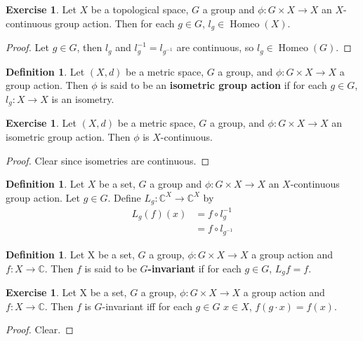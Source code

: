 \documentclass[12pt]{amsart}
\theoremstyle{definition}
\newtheorem{defn}[definition]{Definition}
\newtheorem{ex}[definition]{Exercise}
\newcommand{\C}{\mathbb{C}}
\newcommand{\tbf}[1]{\textbf{#1}}
\DeclareMathOperator{\Homeo}{Homeo}
\DeclareMathOperator*{\0}{\mbf{0}}
\DeclareMathOperator*{\1}{\mbf{1}}
\newcommand{\ld}[1]{\label{defn:#1}}
\begin{document}
	\begin{ex}
	Let $X$ be a topological space, $G$ a group and $\phi: G \times X \rightarrow X$ an $X$-continuous group action. Then for each $g \in G$, $l_g \in \Homeo(X)$.
	\end{ex}
	
	\begin{proof}
	Let $g \in G$, then $l_g$ and $l_{g}^{-1} = l_{g^{-1}}$ are continuous, so $l_g \in \Homeo(G)$. 
	\end{proof}
	
	\begin{defn} \ld{}
	Let $(X, d)$ be a metric space, $G$ a group, and $\phi: G \times X \rightarrow X$ a group action. Then $\phi$ is said to be an \tbf{isometric group action} if for each $g \in G$, $l_g:X \rightarrow X$ is an isometry. 
	\end{defn}
	
	\begin{ex}
	Let $(X, d)$ be a metric space, $G$ a group, and $\phi: G \times X \rightarrow X$ an isometric group action. Then $\phi$ is $X$-continuous.
	\end{ex}
	
	\begin{proof}
	Clear since isometries are continuous.
\end{proof}		
	
	\begin{defn}
	Let $X$ be a set, $G$ a group and $\phi: G \times X \rightarrow X$ an $X$-continuous group action. Let $g \in G$. Define $L_g:\C^X \rightarrow \C^X$ by 
	\begin{align*}
	L_g(f)(x) 
	&= f \circ l_g^{-1} \\
	&= f \circ l_{g^{-1}}
	\end{align*}
	\end{defn}
	
	
	\begin{defn}
	Let X be a set, $G$ a group, $\phi: G \times X \rightarrow X$ a group action and $f:X \rightarrow \C$. Then $f$ is said to be \tbf{$G$-invariant} if for each $g \in G$, $L_g f = f$.
	\end{defn}
	
	\begin{ex}
	Let X be a set, $G$ a group, $\phi: G \times X \rightarrow X$ a group action and $f:X \rightarrow \C$. Then $f$ is $G$-invariant iff for each $g \in G$ $x \in X$, $f(g \cdot x) = f(x)$.  
	\end{ex}
	
	\begin{proof}
	Clear.
	\end{proof}
	
\end{document}
